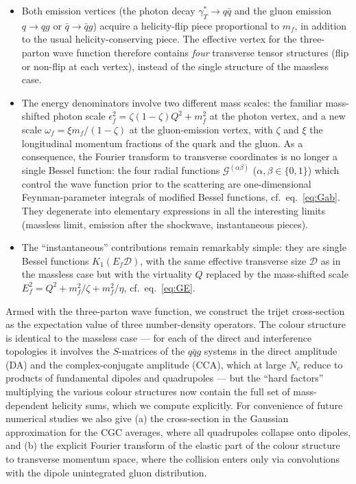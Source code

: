 \documentclass[11pt,a4paper]{article}
\newcommand{\calG}{\mathcal{G}}
\newcommand{\calD}{\mathcal{D}}
\newcommand{\eps}{\epsilon}
\numberwithin{equation}{section}
\begin{document}
\begin{itemize}
\item[\emph{(i)}] Both emission vertices (the photon decay $\gamma^*_T\to q\bar q$ and the
gluon emission $q\to qg$ or $\bar q\to\bar qg$) acquire a helicity-flip piece proportional to
$m_f$, in addition to the usual helicity-conserving piece. The effective vertex for the
three-parton wave function therefore contains \emph{four} transverse tensor structures (flip or
non-flip at each vertex), instead of the single structure of the massless case.

\item[\emph{(ii)}] The energy denominators involve two different mass scales: the familiar
mass-shifted photon scale $\eps_f^2=\zeta(1-\zeta)Q^2+m_f^2$ at the photon vertex, and a new
scale $\omega_f=\xi m_f/(1-\zeta)$ at the gluon-emission vertex, with $\zeta$ and $\xi$ the
longitudinal momentum fractions of the quark and the gluon. As a consequence, the Fourier
transform to transverse coordinates is no longer a single Bessel function: the four radial
functions $\calG^{(\alpha\beta)}$ ($\alpha,\beta\in\{0,1\}$) which control the wave function
prior to the scattering are one-dimensional Feynman-parameter integrals of modified Bessel
functions, cf.~eq.~\eqref{eq:Gab}. They degenerate into elementary expressions in all the
interesting limits (massless limit, emission after the shockwave, instantaneous pieces).

\item[\emph{(iii)}] The ``instantaneous'' contributions remain remarkably simple: they are
single Bessel functions $K_1(E_f\calD)$, with the same effective transverse size $\calD$ as in
the massless case but with the virtuality $Q$ replaced by the mass-shifted scale
$E_f^2=Q^2+m_f^2/\zeta+m_f^2/\eta$, cf.~eq.~\eqref{eq:GE}.
\end{itemize}

Armed with the three-parton wave function, we construct the trijet cross-section as the
expectation value of three number-density operators. The colour structure is identical to the
massless case --- for each of the direct and interference topologies it involves the $S$-matrices
of the $q\bar qg$ systems in the direct amplitude (DA) and the complex-conjugate amplitude
(CCA), which at large $N_c$ reduce to products of fundamental dipoles and quadrupoles --- but
the ``hard factors'' multiplying the various colour structures now contain the full set of
mass-dependent helicity sums, which we compute explicitly. For convenience of future numerical
studies we also give (a) the cross-section in the Gaussian approximation for the CGC averages,
where all quadrupoles collapse onto dipoles, and (b) the explicit Fourier transform of the
elastic part of the colour structure to transverse momentum space, where the collision enters
only via convolutions with the dipole unintegrated gluon distribution.
\end{document}
